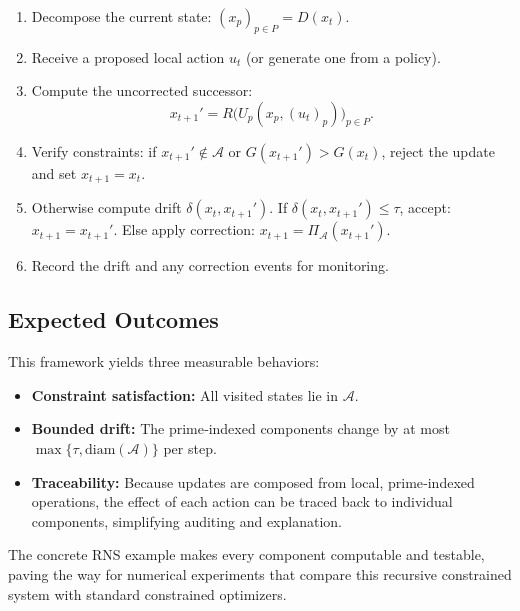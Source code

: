 \documentclass[12pt]{article}
\begin{document}
\begin{enumerate}
\item Decompose the current state: \((x_p)_{p\in P} = D(x_t)\).
\item Receive a proposed local action \(u_t\) (or generate one from a policy).
\item Compute the uncorrected successor:
      \[
      x_{t+1}' = R\bigl( U_p(x_p, (u_t)_p) \bigr)_{p\in P}.
      \]
\item Verify constraints: if \(x_{t+1}'\notin\mathcal{A}\) or \(G(x_{t+1}') > G(x_t)\), reject the update and set \(x_{t+1}=x_t\).
\item Otherwise compute drift \(\delta(x_t,x_{t+1}')\).
      If \(\delta(x_t,x_{t+1}') \le \tau\), accept: \(x_{t+1}=x_{t+1}'\).
      Else apply correction: \(x_{t+1} = \Pi_{\mathcal{A}}(x_{t+1}')\).
\item Record the drift and any correction events for monitoring.
\end{enumerate}

\subsection{Expected Outcomes}

This framework yields three measurable behaviors:
\begin{itemize}
\item \textbf{Constraint satisfaction:} All visited states lie in \(\mathcal{A}\).
\item \textbf{Bounded drift:} The prime‑indexed components change by at most \(\max\{\tau,\text{diam}(\mathcal{A})\}\) per step.
\item \textbf{Traceability:} Because updates are composed from local, prime‑indexed operations, the effect of each action can be traced back to individual components, simplifying auditing and explanation.
\end{itemize}
The concrete RNS example makes every component computable and testable, paving the way for numerical experiments that compare this recursive constrained system with standard constrained optimizers.
\end{document}
